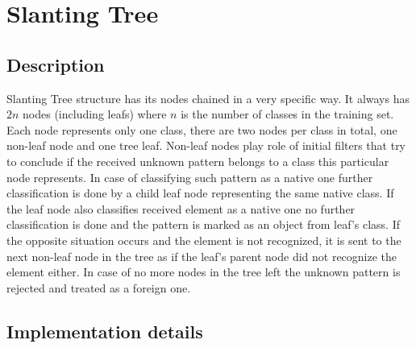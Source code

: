 \section{Slanting Tree}

\subsection{Description}
\label{slanting_tree_description}

Slanting Tree structure has its nodes chained in a very specific way. It always has $ 2n $ nodes (including leafs) where $n$ is the number of classes in the training set. Each node represents only one class, there are two nodes per class in total, one non-leaf node and one tree leaf. Non-leaf nodes play role of initial filters that try to conclude if the received unknown pattern belongs to a class this particular node represents. In case of classifying such pattern as a native one further classification is done by a child leaf node representing the same native class. If the leaf node also classifies received element as a native one no further classification is done and the pattern is marked as an object from leaf's class. If the opposite situation occurs and the element is not recognized, it is sent to the next non-leaf node in the tree as if the leaf's parent node did not recognize the element either. In case of no more nodes in the tree left the unknown pattern is rejected and treated as a foreign one.

\subsection{Implementation details}

